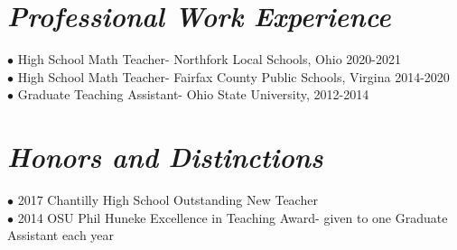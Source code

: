 \documentclass{res}
\begin{document}
\begin{resume}
\section{\sl \bf Professional Work Experience}
\indent $\bullet$ High School Math Teacher- Northfork Local Schools, Ohio 2020-2021\\
\indent $\bullet$ High School Math Teacher- Fairfax County Public Schools, Virgina 2014-2020\\
\indent $\bullet$ Graduate Teaching Assistant- Ohio State University, 2012-2014

\section{\sl  \bf Honors and Distinctions}
\indent $\bullet$ 2017 Chantilly High School Outstanding New Teacher\\
\indent $\bullet$ 2014 OSU Phil Huneke Excellence in Teaching Award-  given to one Graduate Assistant each year


\end{resume}

\vfill 
\end{document}
